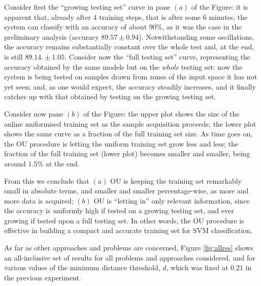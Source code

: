 Consider first the ``growing testing set'' curve in pane $(a)$ of the
Figure: it is apparent that, already after $4$ training steps, that is
after some $6$ minutes, the system can classify with an accuracy of
about $90\%$, as it was the case in the preliminary analysis (accuracy
$89.57 \pm 0.94$). Notwithstanding some oscillations, the accuracy
remains substantially constant over the whole test and, at the end, is
still $89.14. \pm 1.05$. Consider now the ``full testing set'' curve,
representing the accuracy obtained by the same models but on the
\emph{whole} testing set: now the system is being tested on samples
drawn from zones of the input space it has not yet seen; and, as one
would expect, the accuracy steadily increases, and it finally catches
up with that obtained by testing on the growing testing set.

Consider now pane $(b)$ of the Figure: the upper plot shows the size
of the online uniformised training set as the sample acquisition
proceeds; the lower plot shows the same curve as a fraction of the
full training set size. As time goes on, the OU procedure is letting
the uniform training set grow less and less; the fraction of the full
training set (lower plot) becomes smaller and smaller, being around
$1.5\%$ at the end.

From this we conclude that $(a)$ OU is keeping the training set
remarkably small in absolute terms, and smaller and smaller
percentage-wise, as more and more data is acquired; $(b)$ OU is
``letting in'' only relevant information, since the accuracy is
uniformly high if tested on a growing testing set, and ever growing if
tested upon a full testing set. In other words, the OU procedure is
effective in building a compact and accurate training set for SVM
classification.

As far as other approaches and problems are concerned, Figure
\ref{fig:allres} shows an all-inclusive set of results for all
problems and approaches considered, and for various values of the
minimum distance threshold, $d$, which was fixed at $0.21$ in the
previous experiment.

